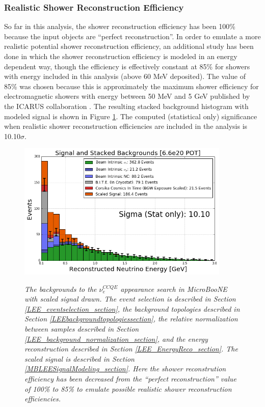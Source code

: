 \subsubsection{Realistic Shower Reconstruction Efficiency}
So far in this analysis, the shower reconstruction efficiency has been 100\% because the input objects are ``perfect reconstruction''. In order to emulate a more realistic potential shower reconstruction efficiency, an additional study has been done in which the shower reconstruction efficiency is modeled in an energy dependent way, though the efficiency is effectively constant at 85\% for showers with energy included in this analysis (above 60 MeV deposited). The value of 85\% was chosen because this is approximately the maximum shower efficiency for electromagnetic showers with energy between 50 MeV and 5 GeV published by the ICARUS collaboration \cite{ICARUS_showereff_source}. The resulting stacked background histogram with modeled signal is shown in Figure \ref{LEE_recoemu_fullstack_fig}. The computed (statistical only) significance when realistic shower reconstruction efficiencies are included in the analysis is 10.10$\sigma$.

\begin{figure}[ht!]
\centering
\includegraphics[width=0.9\textwidth]{Figures/LEE_recoemu_fullstack_WithAnalysisCuts.png}\\
\caption{\textit{The backgrounds to the $\nu_e^{CCQE}$ appearance search in MicroBooNE with scaled signal drawn. The event selection is described in Section \ref{LEE_eventselection_section}, the background topologies described in Section \ref{LEEbackgroundtopologiessection}, the relative normalization between samples described in Section \ref{LEE_background_normalization_section}, and the energy reconstruction described in Section \ref{LEE_EnergyReco_section}. The scaled signal is described in Section \ref{MBLEESignalModeling_section}. Here the shower reconstrution efficiency has been decreased from the ``perfect reconstruction'' value of 100\% to 85\% to emulate possible realistic shower reconstruction efficiencies.}}
\label{LEE_recoemu_fullstack_fig}
\end{figure}


